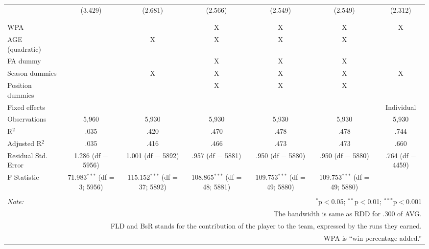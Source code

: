 \begin{table}[H]
\begin{tabular}{@{\extracolsep{-10pt}}lcccccc}
  & (3.429) & (2.681) & (2.566) & (2.549) & (2.549) & (2.312) \\
  & & & & & & \\
\hline \\[-1.8ex]
WPA &  &  & X & X & X & X \\
AGE (quadratic) &  & X & X & X & X &  \\
FA dummy &  &  & X & X & X &  \\
Season dummies &  & X & X & X & X & X \\
Position dummies &  &  & X & X & X &  \\
Fixed effects &  &  &  &  &  & Individual \\
Observations & 5,960 & 5,930 & 5,930 & 5,930 & 5,930 & 5,930 \\
R$^{2}$ & .035 & .420 & .470 & .478 & .478 & .744 \\
Adjusted R$^{2}$ & .035 & .416 & .466 & .473 & .473 & .660 \\
Residual Std. Error & 1.286 (df = 5956) & 1.001 (df = 5892) & .957 (df = 5881) & .950 (df = 5880) & .950 (df = 5880) & .764 (df = 4459) \\
F Statistic & 71.983$^{***}$ (df = 3; 5956) & 115.152$^{***}$ (df = 37; 5892) & 108.865$^{***}$ (df = 48; 5881) & 109.753$^{***}$ (df = 49; 5880) & 109.753$^{***}$ (df = 49; 5880) &  \\
\hline
\hline \\[-1.8ex]
\textit{Note:}  & \multicolumn{6}{r}{$^{*}$p$<$0.05; $^{**}$p$<$0.01; $^{***}$p$<$0.001} \\
& \multicolumn{6}{r}{The bandwidth is same as RDD for .300 of AVG.} \\
& \multicolumn{6}{r}{FLD and BsR stands for the contribution of the player to the team, expressed by the runs they earned.} \\
& \multicolumn{6}{r}{WPA is ``win-percentage added.''} \\
\end{tabular}
\end{table}
